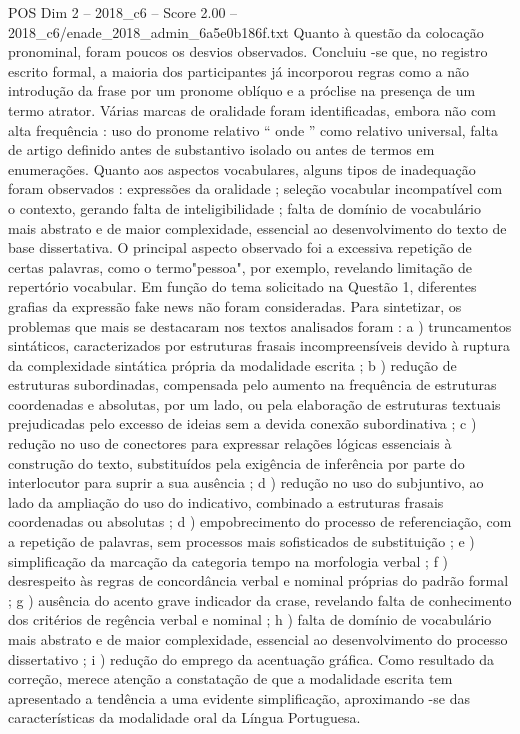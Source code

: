 \begin{textsample}{POS Dim 2 – 2018\_c6 – Score 2.00 – 2018\_c6/enade\_2018\_admin\_6a5e0b186f.txt}
Quanto à questão da colocação pronominal, foram poucos os desvios observados.
Concluiu -se que, no registro escrito formal, a maioria dos participantes já incorporou regras como a não introdução da frase por um pronome oblíquo e a próclise na presença de um termo atrator.
Várias marcas de oralidade foram identificadas, embora não com alta frequência : uso do pronome relativo “ onde ” como relativo universal, falta de artigo definido antes de substantivo isolado ou antes de termos em enumerações.
Quanto aos aspectos vocabulares, alguns tipos de inadequação foram observados : expressões da oralidade ; seleção vocabular incompatível com o contexto, gerando falta de inteligibilidade ; falta de domínio de vocabulário mais abstrato e de maior complexidade, essencial ao desenvolvimento do texto de base dissertativa.
O principal aspecto observado foi a excessiva repetição de certas palavras, como o termo"pessoa", por exemplo, revelando limitação de repertório vocabular.
Em função do tema solicitado na Questão 1, diferentes grafias da expressão fake news não foram consideradas.
Para sintetizar, os problemas que mais se destacaram nos textos analisados foram : a ) truncamentos sintáticos, caracterizados por estruturas frasais incompreensíveis devido à ruptura da complexidade sintática própria da modalidade escrita ; b ) redução de estruturas subordinadas, compensada pelo aumento na frequência de estruturas coordenadas e absolutas, por um lado, ou pela elaboração de estruturas textuais prejudicadas pelo excesso de ideias sem a devida conexão subordinativa ; c ) redução no uso de conectores para expressar relações lógicas essenciais à construção do texto, substituídos pela exigência de inferência por parte do interlocutor para suprir a sua ausência ; d ) redução no uso do subjuntivo, ao lado da ampliação do uso do indicativo, combinado a estruturas frasais coordenadas ou absolutas ; d ) empobrecimento do processo de referenciação, com a repetição de palavras, sem processos mais sofisticados de substituição ; e ) simplificação da marcação da categoria tempo na morfologia verbal ; f ) desrespeito às regras de concordância verbal e nominal próprias do padrão formal ; g ) ausência do acento grave indicador da crase, revelando falta de conhecimento dos critérios de regência verbal e nominal ; h ) falta de domínio de vocabulário mais abstrato e de maior complexidade, essencial ao desenvolvimento do processo dissertativo ; i ) redução do emprego da acentuação gráfica.
Como resultado da correção, merece atenção a constatação de que a modalidade escrita tem apresentado a tendência a uma evidente simplificação, aproximando -se das características da modalidade oral da Língua Portuguesa.

\end{textsample}
